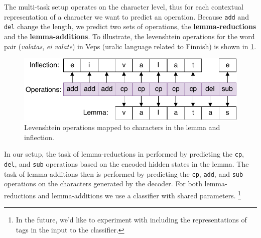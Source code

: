 \documentclass[11pt,a4paper]{article}
\newcommand\jp[1]{\textbf{JP: #1}}
\begin{document}
The multi-task setup operates on the character level, thus for each
contextual representation of a character we want to predict an
operation. Because \texttt{add} and \texttt{del} change the length, we
predict two sets of operations, the \textbf{lemma-reductions} and the
\textbf{lemma-additions}. To illustrate, the levenshtein operations
for the word pair (\emph{valatas}, \emph{ei valate}) in Veps (uralic
language related to Finnish) is shown in \cref{fig:ops}.


\begin{figure}[ht]
\centering
\includegraphics[scale=0.5]{ops.pdf}
\caption{\label{fig:ops} Levenshtein operations mapped to characters in the lemma and
inflection.}
\end{figure}

In our setup, the task of lemma-reductions in performed by predicting
the \texttt{cp}, \texttt{del}, and \texttt{sub} operations based on
the encoded hidden states in the lemma.  The task of lemma-additions
then is performed by predicting the \texttt{cp}, \texttt{add}, and
\texttt{sub} operations on the characters generated by the decoder.
For both lemma-reductions and lemma-additions we use a classifier with
shared parameters. \footnote{In the future, we'd like to experiment
with including the representations of tags in the input to the classifier.}



\end{document}
